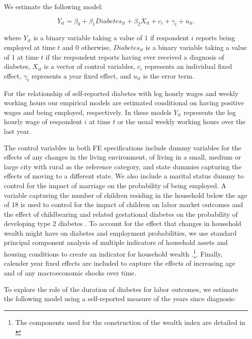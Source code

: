 \documentclass[12pt,english,british]{article}
\begin{document}
We estimate the following model:

\noindent 
\begin{equation}
Y_{it}=\beta_{0}+\beta_{1}Diabetes_{it}+\beta_{2}X_{it}+c_{i}+\gamma_{t}+u_{it}.\label{eq:employed}
\end{equation}


where $Y_{it}$ is a binary variable taking a value of $1$ if respondent
$i$ reports being employed at time $t$ and $0$ otherwise, $Diabetes_{it}$
is a binary variable taking a value of $1$ at time $t$ if the respondent
reports having ever received a diagnosis of diabetes, $X_{it}$ is
a vector of control variables, $c_{i}$ represents an individual fixed
effect, $\gamma_{t}$ represents a year fixed effect, and $u_{it}$
is the error term.

For the relationship of self-reported diabetes with log hourly wages
and weekly working hours our empirical models are estimated conditional on having positive wages and being
employed, respectively. In these models $Y_{it}$ represents the log hourly wage
of respondent $i$ at time $t$ or the usual weekly working hours
over the last year.

The control variables in both \ac{FE} specifications include dummy variables for the effects of any changes in the living environment,
of living in a small, medium or large city with rural as the reference category, and state
dummies capturing the effects of moving to a different state. We also include a marital
status dummy to control for the impact of marriage on the probability of being employed.
A variable capturing the number of children residing in the household
below the age of 18 is used to control for the impact of children
on labor market outcomes and the effect of childbearing and related
gestational diabetes on the probability of developing type 2 diabetes
\citep{Bellamy2009}. To account for the effect that changes in household
wealth might have on diabetes and employment probabilities, we use standard
principal component analysis of multiple indicators of household assets
and housing conditions to create an indicator for household wealth
\citep{Filmer2001}.\footnote{The components used for the construction of the
wealth index are detailed in \citet{Seuring2015}}. Finally, calender year fixed effects are included to capture the effects of increasing age and of any macroeconomic shocks over time.

To explore the role of the duration of diabetes for labor outcomes, we estimate the following model using a self-reported
measure of the years since diagnosis:
\end{document}
